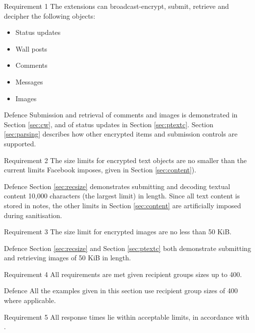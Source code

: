 \begin{desc}

    \item[Requirement 1] The extensions can broadcast-encrypt, submit, retrieve and decipher the following objects:
    
    \begin{itemize}
        \item Status updates
        \item Wall posts
        \item Comments
        \item Messages
        \item Images
    \end{itemize}
    
    \item[Defence] Submission and retrieval of comments and images is demonstrated in Section \ref{sec:cw}, and of status updates in Section \ref{sec:ptextc}. Section \ref{sec:parsing} describes how other encrypted items and submission controls are supported.
    
    \item[Requirement 2] The size limits for encrypted text objects are no smaller than the current limits Facebook imposes, given in Section \ref{sec:content}).
    
    \item[Defence] Section \ref{sec:recsize} demonstrates submitting and decoding textual content 10,000 characters (the largest limit) in length. Since all text content is stored in notes, the other limits in Section \ref{sec:content} are artificially imposed during sanitisation.

    \item[Requirement 3] The size limit for encrypted images are no less than 50 KiB.
    
    \item[Defence] Section \ref{sec:recsize} and Section \ref{sec:ptextc} both demonstrate submitting and retrieving images of 50 KiB in length.

    \item[Requirement 4] All requirements are met given recipient groups sizes up to 400.
    
    \item[Defence] All the examples given in this section use recipient group sizes of 400 where applicable.
    
    \item[Requirement 5] All response times lie within acceptable limits, in accordance with \cite{response}.
    

\end{desc}
